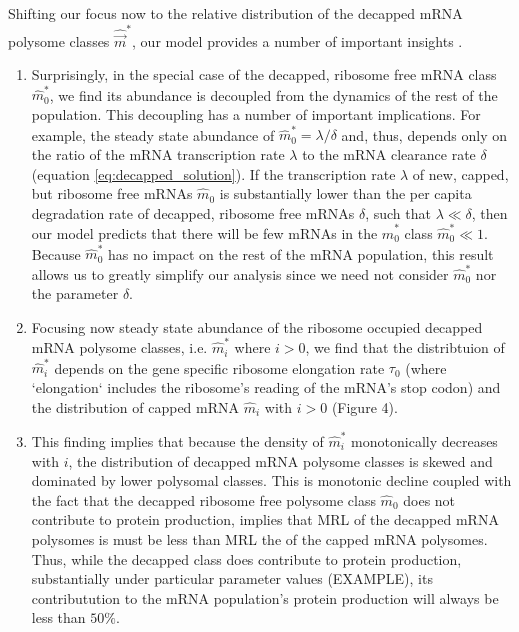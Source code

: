\documentclass[review]{elsarticle}
\newcommand{\mhat}{\ensuremath{\hat{m}}\xspace}
\newcommand{\mvec}{\ensuremath{\vec{m}}\xspace}
\newcommand{\mvechat}{\ensuremath{\hat{\mvec}}\xspace}
\newcommand{\mvechatstar}{\ensuremath{\mvechat^*}\xspace}
\begin{document}
Shifting our focus now to the relative distribution of the decapped mRNA polysome classes \mvechatstar, our model provides a number of important insights .
\begin{enumerate}
\item Surprisingly, in the special case of the decapped, ribosome free mRNA class $\mhat_0^*$, we find its abundance is decoupled from the dynamics of the rest of the population.
  This decoupling has a number of important implications.
  For example, the steady state abundance of $\mhat_0^* = \lambda/\delta$ and, thus, depends only on the ratio of the mRNA transcription rate $\lambda$ to the mRNA clearance rate $\delta$ (equation \ref{eq:decapped_solution}).
  If the transcription rate $\lambda$ of new, capped, but ribosome free mRNAs $\mhat_0$ is substantially lower than the per capita degradation rate of decapped, ribosome free mRNAs $\delta$, such that  $\lambda \ll \delta$, then our model predicts that there will be few mRNAs in the $\mhat_0^*$ class $\mhat_0^* \ll 1$.
  Because $\mhat^*_0$ has no impact on the rest of the mRNA population, this result allows us to greatly simplify our analysis since we need not consider $\mhat_0^*$ nor the parameter $\delta$.
\item Focusing now steady state abundance of the ribosome occupied decapped mRNA polysome classes, i.e.  $\mhat_i^*$ where $i > 0$, we find that the distribtuion of $\mhat^*_i$  depends on the gene specific ribosome elongation rate $\tau_0$ (where `elongation`  includes the ribosome's reading of the mRNA's stop codon) and the distribution of capped mRNA $\mhat_i$ with $i > 0$ (Figure 4).
\item \label{item:protein_production} This finding implies that because the density of $\mhat^*_i$ monotonically decreases with $i$, the distribution of decapped mRNA polysome classes is skewed and dominated by lower polysomal classes.
  This is monotonic decline coupled with the fact that the decapped ribosome free polysome class $\mhat_0$ does not contribute to protein production, implies that MRL of the decapped mRNA polysomes is must be less than MRL the of the capped mRNA polysomes.
  Thus, while the decapped class does contribute to protein production, substantially under particular parameter values (EXAMPLE), its contributution to the mRNA population's protein production will always be less than  $50\%$.
\end{enumerate}
\end{document}
